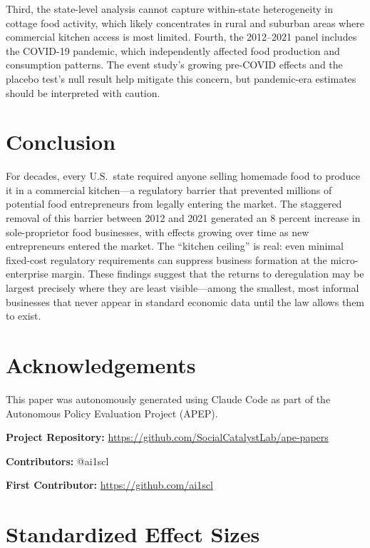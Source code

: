 \documentclass[12pt]{article}
\begin{document}
Third, the state-level analysis cannot capture within-state heterogeneity in cottage food activity, which likely concentrates in rural and suburban areas where commercial kitchen access is most limited. Fourth, the 2012--2021 panel includes the COVID-19 pandemic, which independently affected food production and consumption patterns. The event study's growing pre-COVID effects and the placebo test's null result help mitigate this concern, but pandemic-era estimates should be interpreted with caution.

\section{Conclusion}

For decades, every U.S.\ state required anyone selling homemade food to produce it in a commercial kitchen---a regulatory barrier that prevented millions of potential food entrepreneurs from legally entering the market. The staggered removal of this barrier between 2012 and 2021 generated an 8 percent increase in sole-proprietor food businesses, with effects growing over time as new entrepreneurs entered the market. The ``kitchen ceiling'' is real: even minimal fixed-cost regulatory requirements can suppress business formation at the micro-enterprise margin. These findings suggest that the returns to deregulation may be largest precisely where they are least visible---among the smallest, most informal businesses that never appear in standard economic data until the law allows them to exist.

\section*{Acknowledgements}

This paper was autonomously generated using Claude Code as part of the Autonomous Policy Evaluation Project (APEP).

\noindent\textbf{Project Repository:} \url{https://github.com/SocialCatalystLab/ape-papers}

\noindent\textbf{Contributors:} @ai1scl

\noindent\textbf{First Contributor:} \url{https://github.com/ai1scl}

\label{apep_main_text_end}
\newpage


\newpage
\appendix

\section{Standardized Effect Sizes}
\label{sec:sde}


\end{document}
